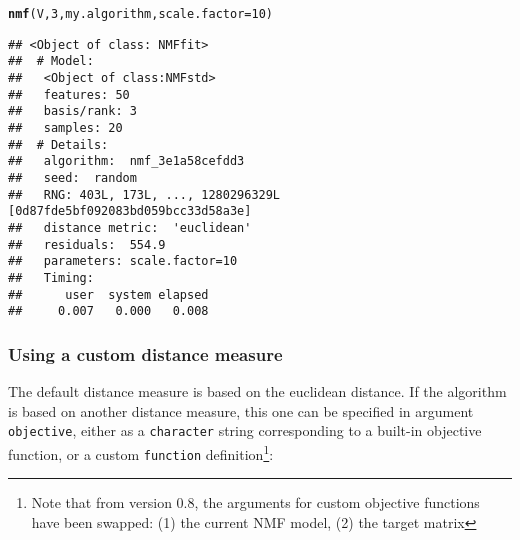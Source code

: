 \documentclass[a4paper]{article}\usepackage[]{graphicx}\usepackage[]{color}
\makeatletter
\newcommand{\hlnum}[1]{\textcolor[rgb]{0.686,0.059,0.569}{#1}}%
\newcommand{\hlstd}[1]{\textcolor[rgb]{0.345,0.345,0.345}{#1}}%
\newcommand{\hlkwc}[1]{\textcolor[rgb]{0.333,0.667,0.333}{#1}}%
\newcommand{\hlkwd}[1]{\textcolor[rgb]{0.737,0.353,0.396}{\textbf{#1}}}%
\newenvironment{kframe}{%
 \def\at@end@of@kframe{}%
 \ifinner\ifhmode%
  \def\at@end@of@kframe{\end{minipage}}%
  \begin{minipage}{\columnwidth}%
 \fi\fi%
 \def\FrameCommand##1{\hskip\@totalleftmargin \hskip-\fboxsep
 \colorbox{shadecolor}{##1}\hskip-\fboxsep
     \hskip-\linewidth \hskip-\@totalleftmargin \hskip\columnwidth}%
 \MakeFramed {\advance\hsize-\width
   \@totalleftmargin\z@ \linewidth\hsize
   \@setminipage}}%
 {\par\unskip\endMakeFramed%
 \at@end@of@kframe}
\newenvironment{knitrout}{}{} %
\let\code=\texttt
\makeatother
\begin{document}
\begin{knitrout}
\color{fgcolor}\begin{kframe}
\begin{alltt}
\hlkwd{nmf}\hlstd{(V,} \hlnum{3}\hlstd{, my.algorithm,} \hlkwc{scale.factor}\hlstd{=}\hlnum{10}\hlstd{)}
\end{alltt}
\begin{verbatim}
## <Object of class: NMFfit>
##  # Model:
##   <Object of class:NMFstd>
##   features: 50 
##   basis/rank: 3 
##   samples: 20 
##  # Details:
##   algorithm:  nmf_3e1a58cefdd3 
##   seed:  random 
##   RNG: 403L, 173L, ..., 1280296329L [0d87fde5bf092083bd059bcc33d58a3e]
##   distance metric:  'euclidean' 
##   residuals:  554.9 
##   parameters: scale.factor=10 
##   Timing:
##      user  system elapsed 
##     0.007   0.000   0.008
\end{verbatim}
\end{kframe}
\end{knitrout}

\subsubsection{Using a custom distance measure}
The default distance measure is based on the euclidean distance. 
If the algorithm is based on another distance measure, this one can be specified in argument \code{objective}, either as a \code{character} string corresponding to a built-in objective function, or a custom \code{function} definition\footnote{Note that from version 0.8, the arguments for custom objective functions have been swapped: (1) the current NMF model, (2) the target matrix}:
\end{document}
